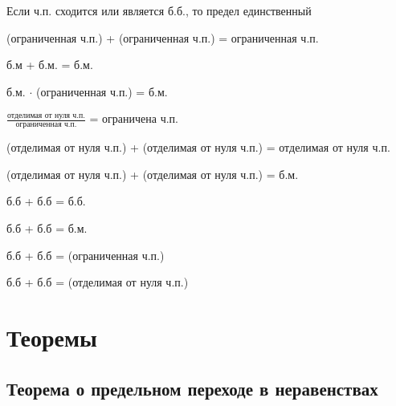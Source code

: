 \nt
{
    Если ч.п. сходится или является б.б., то предел единственный
}

{
    (ограниченная ч.п.) + (ограниченная ч.п.) = ограниченная ч.п.

    б.м + б.м. = б.м.

    б.м. $\cdot$ (ограниченная ч.п.) = б.м.

    $\frac{\text{отделимая от нуля ч.п.}}{\text{ограниченная ч.п.}}$ = ограничена ч.п.
}

{
    (отделимая от нуля ч.п.) + (отделимая от нуля ч.п.) = отделимая от нуля ч.п.

    (отделимая от нуля ч.п.) + (отделимая от нуля ч.п.) = б.м.

    б.б + б.б = б.б.

    б.б + б.б = б.м.

    б.б + б.б = (ограниченная ч.п.)

    б.б + б.б = (отделимая от нуля ч.п.)
}

\section{Теоремы}

\subsection{Теорема о предельном переходе в неравенствах}


